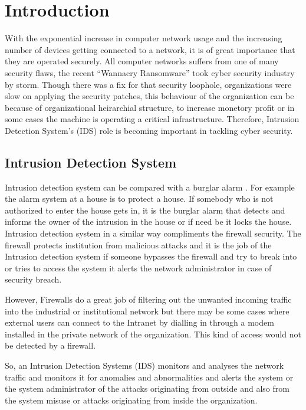 \documentclass[12pt, a4paper]{report}
\begin{document}
\chapter{Introduction}\label{sec:intro}
\justify
With the exponential increase in computer network usage and the increasing number of devices getting connected to a network, it is of great importance that they are operated securely. All computer networks suffers from one of many security flaws, the recent ``Wannacry Ransomware'' took cyber security industry by storm. Though there was a fix for that security loophole, organizations were slow on applying the security patches, this behaviour of the organization can be because of organizational heirarchial structure, to increase monetory profit or in some cases the machine is operating a critical infrastructure. Therefore, Intrusion Detection System's (IDS) role is becoming important in tackling cyber security.\\ \par

\section{Intrusion Detection System}\label{sec:introintrusion}

\justify
Intrusion detection system can be compared with a burglar alarm \cite{IDS}. For example the alarm system at a house is to protect a house. If somebody who is not authorized to enter the house gets in, it is the burglar alarm that detects and informs the owner of the intrusion in the house or if need be it locks the house. Intrusion detection system in a similar way compliments the firewall security. The firewall protects institution from malicious attacks and it is the job of the Intrusion detection system if someone bypasses the firewall and try to break into or tries to access the system  it alerts the network administrator in case of security breach.\\ \par

However, Firewalls do a great job of filtering out the unwanted incoming traffic into the industrial or institutional network but there may be some cases where external users can connect to the Intranet by dialling in through a modem installed in the private network of the organization. This kind of access would not be detected by a firewall.\cite{IDS}

So, an Intrusion Detection Systems (IDS) monitors and analyses the network traffic and monitors it for anomalies and abnormalities and alerts the system or the system administrator of the attacks originating from outside and also from the system misuse or attacks originating from inside the organization.\\ \par
\end{document}

